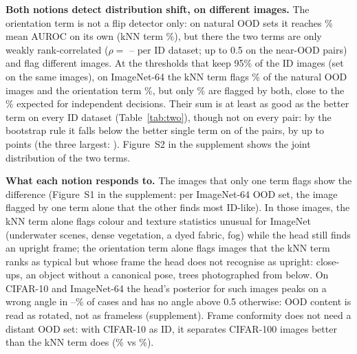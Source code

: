 \documentclass{article}
\begin{document}
\textbf{Both notions detect distribution shift, on different images.} The orientation term is not a flip detector only: on natural OOD sets it reaches \poseMean\% mean AUROC on its own (kNN term \contentMean\%), but there the two terms are only weakly rank-correlated ($\rho=$ \tnRhoOODmin--\tnRhoOODmax{} per ID dataset; up to 0.5 on the near-OOD pairs) and flag different images. At the thresholds that keep 95\% of the ID images (set on the same images), on ImageNet-64 the kNN term flags \tnINknn\% of the natural OOD images and the orientation term \tnINhead\%, but only \tnINboth\% are flagged by both, close to the \tnINindep\% expected for independent decisions. Their sum is at least as good as the better term on every ID dataset (Table~\ref{tab:two}), though not on every pair: by the bootstrap rule it falls below the better single term on \nSumBelowBest{} of the \nNatPairsMain{} pairs, by up to \sumBelowBestMaxGap{} points (the three largest: \sumBelowBestList). Figure~S2 in the supplement shows the joint distribution of the two terms.

\textbf{What each notion responds to.} The images that only one term flags show the difference (Figure~S1 in the supplement: per ImageNet-64 OOD set, the image flagged by one term alone that the other finds most ID-like). In those images, the kNN term alone flags colour and texture statistics unusual for ImageNet (underwater scenes, dense vegetation, a dyed fabric, fog) while the head still finds an upright frame; the orientation term alone flags images that the kNN term ranks as typical but whose frame the head does not recognise as upright: close-ups, an object without a canonical pose, trees photographed from below. On CIFAR-10 and ImageNet-64 the head's posterior for such images peaks on a wrong angle in \psOrOnlyWrongBigMin--\psOrOnlyWrongBigMax\% of cases and has no angle above 0.5 otherwise: OOD content is read as rotated, not as frameless (supplement). Frame conformity does not need a distant OOD set: with CIFAR-10 as ID, it separates CIFAR-100 images better than the kNN term does (\poseCtenCh\% vs \contentCtenCh\%).
\end{document}

